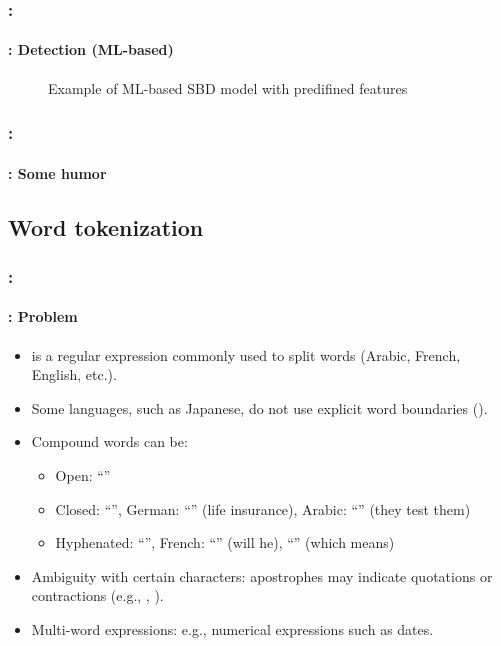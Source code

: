 \documentclass[xcolor=table]{beamer}
\begin{document}
\begin{frame}
	\frametitle{\insertshortsubtitle: \insertsection}
	\framesubtitle{\insertsubsection: Detection (ML-based)} 
	
	\begin{figure}
		\centering
		\caption{Example of ML-based SBD model with predifined features}
	\end{figure}
	
\end{frame}

\begin{frame}
	\frametitle{\insertshortsubtitle: \insertsection}
	\framesubtitle{\insertsubsection: Some humor} 


	\begin{center}
	\end{center}

\end{frame}

\subsection{Word tokenization}

\begin{frame}
	\frametitle{\insertshortsubtitle: \insertsection}
	\framesubtitle{\insertsubsection: Problem} 

	\begin{itemize}
		\item \expword{/[ ]+/} is a regular expression commonly used to split words (Arabic, French, English, etc.).
		\item Some languages, such as Japanese, do not use explicit word boundaries ().
		\item Compound words can be:
		\begin{itemize}
			\item Open: ``''  
			\item Closed: ``'', German: ``'' (life insurance), Arabic: ``'' (they test them)  
			\item Hyphenated: ``'', French: ``'' (will he), ``'' (which means)
		\end{itemize}
		\item Ambiguity with certain characters: apostrophes may indicate quotations or contractions (e.g., , ).
		\item Multi-word expressions: e.g., numerical expressions such as dates.
	\end{itemize}

\end{frame}
\end{document}

